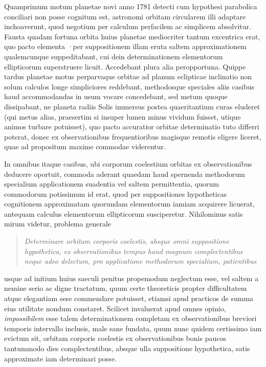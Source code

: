 Quamprimum motum planetae novi anno 1781 detecti cum hypothesi parabolica conciliari non posse cognitum est, astronomi orbitam circularem illi adaptare inchoaverunt, quod negotium per calculum perfacilem ac simplicem absolvitur. Fausta quadam fortuna orbita huius planetae mediocriter tantum excentrica erat, quo pacto elementa ·per suppositionem illam eruta saltem approximationem qualemcunque suppeditabant, cui dein determinationem elementorum ellipticorum superstruere licuit. Accedebant plura alia peropportuna. Quippe tardus planetae motus perparvaque orbitae ad planum eclipticae inclinatio non solum calculos longe simpliciores reddebant, methodosque speciales aliis casibus haud accommodandas in usum vocare concedebant, sed metum quoque dissipabant, ne planeta radiis Solis immersus postea quaeritantium curas eluderet (qui metus alias, praesertim si insuper lumen minus vividum fuisset, utique animos turbare potuisset), quo pacto accuratior orbitae determinatio tuto differri poterat, donec ex observationibus frequentioribus magisque remotis eligere liceret, quae ad propositum maxime commodae viderentur.

In omnibus itaque casibus, ubi corporum coelestium orbitas ex observationibus deducere oportuit, commoda aderant quaedam haud spernenda methodorum specialium applicationem suadentia vel saltem permittentia, quorum commodorum potissimum id erat, quod per suppositiones hypotheticas cognitionem approximatam quorundam elementorum iamiam acquirere licuerat, antequam calculus elementorum ellipticorum susciperetur. Nihilominus satis mirum videtur, problema generale

\begin{quote}\itshape
Determinare orbitam corporis coelestis, absque omni suppositione hypothetica, ex observationibus tempus haud magnum complectentibus neque adeo delectum, pro applicatione methodorum specialium, patientibus
\end{quote}
\noindent usque ad initium huius saeculi penitus propemodum neglectum esse, vel saltem a nemine serio ac digne tractatum, quum certe theoreticis propter difficultatem atque elegantiam sese commendare potuisset, etiamsi apud practicos de summa eius utilitate nondum constaret. Scilicet invaluerat apud omnes opinio, \emph{impossibilem} esse talem determinationem completam ex observationibus breviori temporis intervallo inclusis, male sane fundata, quum nunc quidem certissimo iam evictum sit, orbitam corporis coelestis ex observationibus bonis paucos tantummodo dies complectentibus, absque ulla suppositione hypothetica, satis approximate iam determinari posse.

